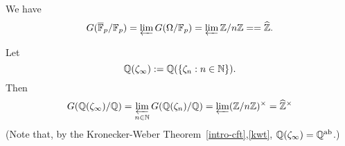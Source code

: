 \begin{ex}
We have 
\[
G(\ol{\F}_p/\F_p)=\varprojlim G(\Om/\F_p)=\varprojlim \Z/n\Z=%
=\wh{\Z}.
\]
\end{ex}
\begin{ex}
Let
\[
\mathbb{Q}(\zeta_{\infty}):=\mathbb{Q}(\left\{{\zeta_n}:{n\in \mathbb{N}}\right\}).
\]
Then
\[
G(\mathbb{Q}(\zeta_{\infty})/\mathbb{Q})=
\varprojlim_{n\in \mathbb{N}} G(\mathbb{Q}(\zeta_n)/\mathbb{Q})=\varprojlim (\mathbb{Z}/n\mathbb{Z})^{\times}=\widehat{\mathbb{Z}}^{\times}
\]
(Note that, by the Kronecker-Weber Theorem~\ref{intro-cft},\ref{kwt}, $\mathbb{Q}(\zeta_{\infty})=\mathbb{Q}^{\text{ab}}$.)
\end{ex}